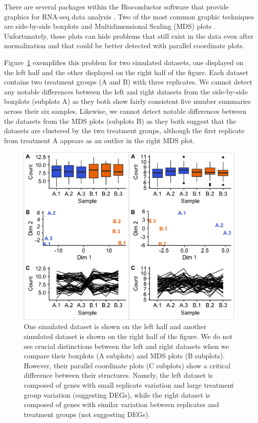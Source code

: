 \documentclass{bioinfo}
\begin{document}
There are several packages within the Bioconductor software that provide graphics for RNA-seq data analysis \citep{Huber}. Two of the most common graphic techniques are side-by-side boxplots and Multidimensional Scaling (MDS) plots \citep{Love, Risso, Robinson, Ritchie}. Unfortunately, these plots can hide problems that still exist in the data even after normalization and that could be better detected with parallel coordinate plots.

Figure~\ref{2group} exemplifies this problem for two simulated datasets, one displayed on the left half and the other displayed on the right half of the figure. Each dataset contains two treatment groups (A and B) with three replicates. We cannot detect any notable differences between the left and right datasets from the side-by-side boxplots (subplots A) as they both show fairly consistent five number summaries across their six samples. Likewise, we cannot detect notable differences between the datasets from the MDS plots (subplots B) as they both suggest that the datasets are clustered by the two treatment groups, although the first replicate from treatment A appears as an outlier in the right MDS plot.

\begin{figure}[!tpb]
\centerline{\includegraphics[width=\columnwidth]{../Bioinformatics/Pictures/bmp/Color/2group.png}}
\caption{One simulated dataset is shown on the left half and another simulated dataset is shown on the right half of the figure. We do not see crucial distinctions between the left and right datasets when we compare their boxplots (A subplots) and MDS plots (B subplots). However, their parallel coordinate plots (C subplots) show a critical difference between their structures. Namely, the left dataset is composed of genes with small replicate variation and large treatment group variation (suggesting DEGs), while the right dataset is composed of genes with similar variation between replicates and treatment groups (not suggesting DEGs). 
\label{2group}}
\end{figure}
\end{document}
